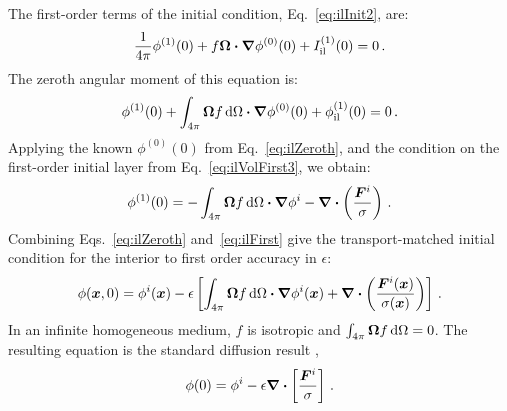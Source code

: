 The first-order terms of the initial condition, Eq.~\eqref{eq:ilInit2}, are:
\begin{equation*}
 \frac{1}{4\pi} \phi^{(1)}(0)
 + f \bm{\Omega} \bm{\cdot} \bm{\nabla} \phi^{(0)}(0)
 + I_\mathrm{il}^{(1)}(0) = 0\,.
\end{equation*}
The zeroth angular moment of this equation is:
\begin{equation*}
 \phi^{(1)}(0)
 + \int_{4\pi}\bm{\Omega} f \mathop{}\!\mathrm{d}\Omega \bm{\cdot} \bm{\nabla} \phi^{(0)}(0)
 + \phi_\mathrm{il}^{(1)}(0) = 0\,.
\end{equation*}
Applying the known $\phi^{(0)}(0)$ from
Eq.~\eqref{eq:ilZeroth}, and the condition on the first-order initial layer
from Eq.~\eqref{eq:ilVolFirst3}, we obtain:
\begin{equation}\label{eq:ilFirst}
 \phi^{(1)}(0) = 
 - \int_{4\pi}\bm{\Omega} f \mathop{}\!\mathrm{d}\Omega \bm{\cdot} \bm{\nabla} \phi^i
 - \bm{\nabla} \bm{\cdot} \left(\frac{\bm{F}^i}{\sigma} \right)\,.
\end{equation}
Combining Eqs.~\eqref{eq:ilZeroth} and~\eqref{eq:ilFirst} give the
transport-matched initial condition for the interior to first order accuracy
in $\epsilon$:
\begin{equation}\label{eq:ilMatched}
  \phi(\bm{x},0) = \phi^i(\bm{x})
- \epsilon \left[ \int_{4\pi}\bm{\Omega} f \mathop{}\!\mathrm{d}\Omega \bm{\cdot} \bm{\nabla} \phi^i(\bm{x})
+ \bm{\nabla} \bm{\cdot} \left(\frac{\bm{F}^i(\bm{x})}{\sigma(\bm{x})} \right) \right]
\,.
\end{equation}
In an infinite homogeneous medium, $f$ is isotropic and
$\int_{4\pi}\bm{\Omega} f \mathop{}\!\mathrm{d}\Omega=0$. The
resulting equation is the standard diffusion result \cite{Mal1991},
\begin{equation*}
 \phi(0) = \phi^i - \epsilon\bm{\nabla} \bm{\cdot} \left[\frac{\bm{F}^i}{\sigma} \right]\,.
\end{equation*}

